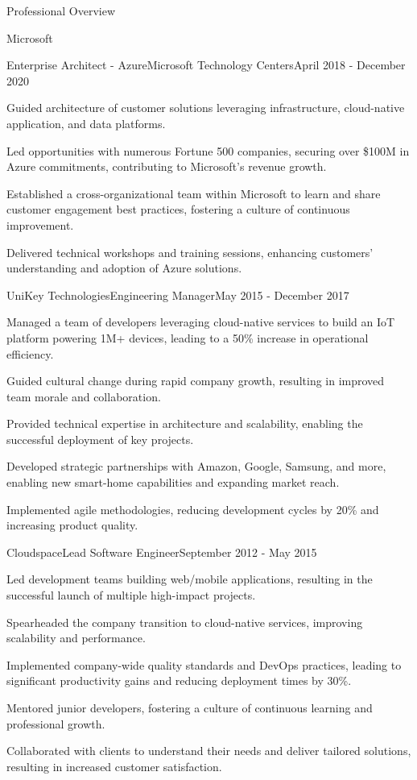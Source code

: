 \documentclass{resume} %
\begin{document}
\begin{rSection}{Professional Overview}
\begin{rCompany}{Microsoft}{}{}
    \begin{rSubSubsection}{Enterprise Architect - Azure}{Microsoft Technology Centers}{April 2018 - December 2020}
        \item Guided architecture of customer solutions leveraging infrastructure, cloud-native application, and data platforms.
        \item Led opportunities with numerous Fortune 500 companies, securing over \$100M in Azure commitments, contributing to Microsoft's revenue growth.
        \item Established a cross-organizational team within Microsoft to learn and share customer engagement best practices, fostering a culture of continuous improvement.
        \item Delivered technical workshops and training sessions, enhancing customers' understanding and adoption of Azure solutions.
    \end{rSubSubsection}
  \end{rCompany}

  \begin{rNewRole}{UniKey Technologies}{Engineering Manager}{May 2015 - December 2017}
    \item Managed a team of developers leveraging cloud-native services to build an IoT platform powering 1M+ devices, leading to a 50\% increase in operational efficiency.
    \item Guided cultural change during rapid company growth, resulting in improved team morale and collaboration.
    \item Provided technical expertise in architecture and scalability, enabling the successful deployment of key projects.
    \item Developed strategic partnerships with Amazon, Google, Samsung, and more, enabling new smart-home capabilities and expanding market reach.
    \item Implemented agile methodologies, reducing development cycles by 20\% and increasing product quality.
  \end{rNewRole}

  \begin{rNewRole}{Cloudspace}{Lead Software Engineer}{September 2012 - May 2015}
    \item Led development teams building web/mobile applications, resulting in the successful launch of multiple high-impact projects.
    \item Spearheaded the company transition to cloud-native services, improving scalability and performance.
    \item Implemented company-wide quality standards and DevOps practices, leading to significant productivity gains and reducing deployment times by 30\%.
    \item Mentored junior developers, fostering a culture of continuous learning and professional growth.
    \item Collaborated with clients to understand their needs and deliver tailored solutions, resulting in increased customer satisfaction.
  \end{rNewRole}
  

\end{rSection}
\end{document}
